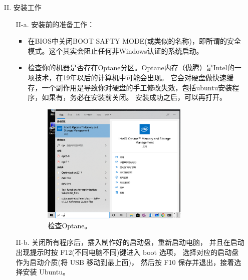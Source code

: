 \begin{itemize}
	\item [II.] 安装工作
	        \begin{itemize}
                        \item [II-a.] 安装前的准备工作：
                                \begin{itemize}
                                        \item 在BIOS中关闭BOOT SAFTY MODE(或类似的名称)，即所谓的安全模式。这个其实会阻止任何非Windows认证的系统启动。 
                                        \item 检查你的机器是否存在Optane分区。Optane内存（傲腾）是Intel的一项技术，在19年以后的计算机中可能会出现。
                                          它会对硬盘做快速缓存，一个副作用是导致你对硬盘的手工修改失效，包括ubuntu安装程序，如果有，务必在安装前关闭。
                                          安装成功之后，可以再打开。
 				                  \begin{figure}[htbp]
					                  \centering
						          \includegraphics[width=0.75\textwidth]{png/optane}
                                                          \caption{检查Optane。}
                                                          \label{fig:optane}
				                  \end{figure}
                                \end{itemize}
			\item [II-b.] 关闭所有程序后，插入制作好的启动盘，重新启动电脑，
				并且在启动出现提示时按 F12(不同电脑不同)键进入 boot 选项，
				选择对应的启动盘作为启动介质(将 USB 移动到最上面)，
				然后按 F10 保存并退出，接着选择安装 Ubuntu。
				\begin{figure}[htbp]
					\centering
\end{figure}
\end{itemize}
\end{itemize}
